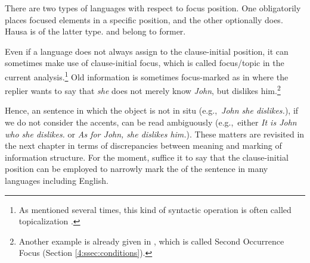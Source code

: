 


\noindent There are two types of languages with respect to focus
position. One obligatorily places focused elements in a specific
position, and the other optionally does. Hausa is of the latter type.
 and  belong to former.  


Even if a language does not always assign  to the clause-initial
position, it can sometimes make use of clause-initial focus, which is
called focus/topic  in the current analysis.\footnote{As
  mentioned several times, this kind of syntactic operation is often
  called topicalization \citep{prince:84,man:07}.}  Old information is
sometimes focus-marked as in 
where the replier wants to say that \textit{she} does not merely know
\textit{John}, but dislikes him.\footnote{Another example is already
  given in , which is called Second
  Occurrence Focus (Section \ref{4:ssec:conditions}).}



\noindent Hence, an  sentence in which the object is not
in situ (e.g.,\ \textit{John she dislikes.}), if we do not
consider the accents, can be read ambiguously (e.g.,\ either
\textit{It is John who she dislikes.} or \textit{As for John, she
  dislikes him.}).  These matters are revisited in the next chapter in
terms of discrepancies between meaning and marking of information
structure.
For the moment, suffice it to say that the clause-initial
position can be employed to narrowly mark the  of the sentence in
many languages including English.


